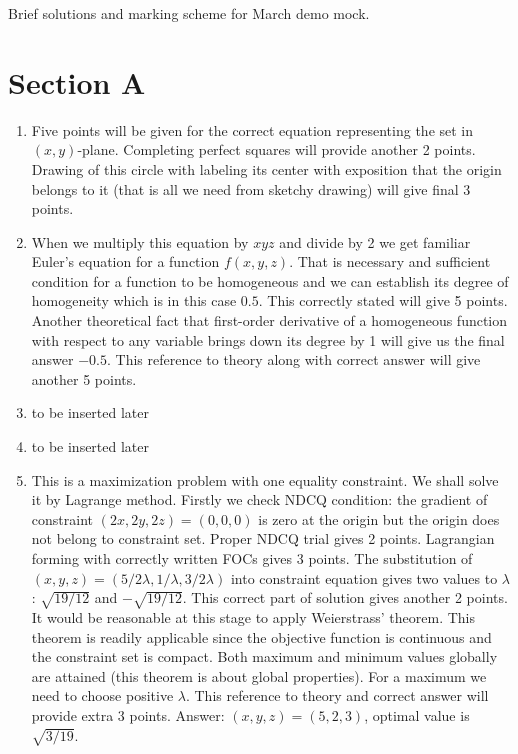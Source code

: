 \documentclass[12pt]{article} %
\theoremstyle{definition} %
\begin{document}
Brief solutions and marking scheme for March demo mock.



\section*{Section A}


\begin{enumerate}

\item Five points will be given for the correct equation representing the set in $(x, y)$-plane. 
Completing perfect squares will provide another 2 points. 
Drawing of this circle with labeling its center with exposition that the origin belongs to it 
(that is all we need from sketchy drawing) will give final 3 points.

\item When we multiply this equation by $xyz$ and divide by 2 we get 
familiar Euler’s equation for a function $f(x, y, z)$. 
That is necessary and sufficient condition for a function to be homogeneous and 
we can establish its degree of homogeneity which is in this case $0.5$. 
This correctly stated will give 5 points. 
Another theoretical fact that first-order derivative of a homogeneous function 
with respect to any variable brings down its degree by 1 will give us the final answer $-0.5$. 
This reference to theory along with correct answer will give another 5 points.

\item to be inserted later

\item to be inserted later

\item This is a maximization problem with one equality constraint. 
We shall solve it by Lagrange method. 
Firstly we check NDCQ condition: 
the gradient of constraint $(2x, 2y, 2z) = (0, 0, 0)$ is zero at the origin 
but the origin does not belong to constraint set. 
Proper NDCQ trial gives 2 points. 
Lagrangian forming with correctly written FOCs gives 3 points. 
The substitution of $(x, y, z) = (5/2\lambda, 1/\lambda, 3/2\lambda)$ 
into constraint equation gives two values to $\lambda$: $\sqrt{19/12}$ and $-\sqrt{19/12}$. 
This correct part of solution gives another 2 points. 
It would be reasonable at this stage to apply Weierstrass’ theorem. 
This theorem is readily applicable since 
the objective function is continuous and the constraint set is compact. 
Both maximum and minimum values globally are attained 
(this theorem is about global properties). 
For a maximum we need to choose positive $\lambda$. 
This reference to theory and correct answer will provide extra 3 points. 
Answer: $(x, y, z) = (5, 2, 3)$, optimal value is $\sqrt{3/19}$.


\end{enumerate}
\end{document}
